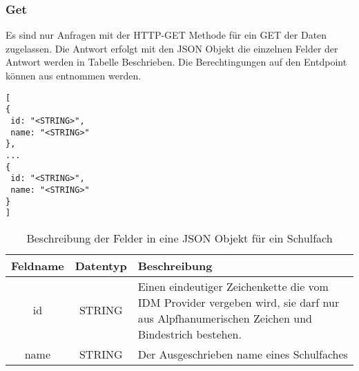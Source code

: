 \subsubsection{Get}
\label{sec:end:rest:api:school-subjects:get}
Es sind nur Anfragen mit der HTTP-GET Methode für ein GET der Daten zugelassen.
Die Antwort erfolgt mit den JSON Objekt  die einzelnen Felder der Antwort werden in Tabelle  Beschrieben.
Die Berechtingungen auf den Entdpoint können aus  entnommen werden.

\begin{lstlisting}[caption={JSON Antwort für ein GET aufruf der Route /api/school-subjects},label={lst:code:end:rest:api:school-subjects:get:ret},frame=tlrb]
[
{
 id: "<STRING>",
 name: "<STRING>"
},
...
{
 id: "<STRING>",
 name: "<STRING>"
}
]
\end{lstlisting}
\begin{table}[!htb]
	\begin{tabularx}{\textwidth}{|c|c|X|}
		\hline
			\textbf{Feldname} & \textbf{Datentyp} & \textbf{Beschreibung} \\ \hline
			id & STRING & Einen eindeutiger Zeichenkette die vom IDM Provider vergeben wird, sie darf nur aus Alpfhanumerischen Zeichen und Bindestrich bestehen.\\ \hline
			name & STRING & Der Ausgeschrieben name eines Schulfaches \\ \hline
	\end{tabularx}

		\caption{Beschreibung der Felder in eine JSON Objekt für ein Schulfach}
		\label{tab:end:rest:api:school-subjects:get:ret:json}
\end{table}

